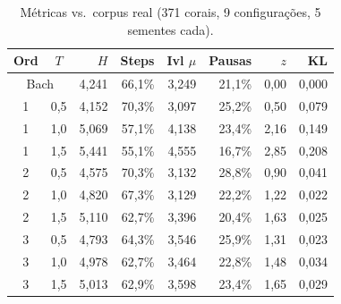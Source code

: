 \documentclass{article}
\begin{document}
\begin{table}[ht]
  \centering
  \footnotesize
  \setlength{\tabcolsep}{3pt}
  \caption{Métricas vs.\ corpus real (371 corais, 9 configurações, 5 sementes cada).}
  \label{tab:results}
  \begin{tabular}{ccrrrrrr}
    \toprule
    Ord                      & $T$   & $H$    & Steps  & Ivl $\mu$ & Pausas &
    $z$                      & KL                                             \\
    \midrule
    \multicolumn{2}{c}{Bach} & 4,241 & 66,1\% & 3,249  & 21,1\%    & 0,00   &
    0,000                                                                     \\
    1                        & 0,5   & 4,152  & 70,3\% & 3,097     & 25,2\% &
    0,50                     & 0,079                                          \\
    1                        & 1,0   & 5,069  & 57,1\% & 4,138     & 23,4\% &
    2,16                     & 0,149                                          \\
    1                        & 1,5   & 5,441  & 55,1\% & 4,555     & 16,7\% &
    2,85                     & 0,208                                          \\
    2                        & 0,5   & 4,575  & 70,3\% & 3,132     & 28,8\% &
    0,90                     & 0,041                                          \\
    2                        & 1,0   & 4,820  & 67,3\% & 3,129     & 22,2\% &
    1,22                     & 0,022                                          \\
    2                        & 1,5   & 5,110  & 62,7\% & 3,396     & 20,4\% &
    1,63                     & 0,025                                          \\
    3                        & 0,5   & 4,793  & 64,3\% & 3,546     & 25,9\% &
    1,31                     & 0,023                                          \\
    3                        & 1,0   & 4,978  & 62,7\% & 3,464     & 22,8\% &
    1,48                     & 0,034                                          \\
    3                        & 1,5   & 5,013  & 62,9\% & 3,598     & 23,4\% &
    1,65                     & 0,029                                          \\
    \bottomrule
  \end{tabular}
\end{table}
\end{document}

